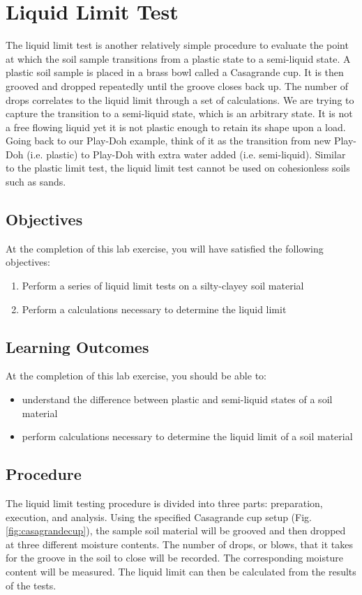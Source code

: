 \documentclass[12pt]{article}
\begin{document}
\pagebreak
\section{Liquid Limit Test}
The liquid limit test is another relatively simple procedure to evaluate the point at which the soil sample transitions from a plastic state to a semi-liquid state. A plastic soil sample is placed in a brass bowl called a Casagrande cup. It is then grooved and dropped repeatedly until the groove closes back up. The number of drops correlates to the liquid limit through a set of calculations. We are trying to capture the transition to a semi-liquid state, which is an arbitrary state. It is not a free flowing liquid yet it is not plastic enough to retain its shape upon a load. Going back to our Play-Doh\textregistered{} example, think of it as the transition from new Play-Doh\textregistered{} (i.e. plastic) to Play-Doh\textregistered{} with extra water added (i.e. semi-liquid). Similar to the plastic limit test, the liquid limit test cannot be used on cohesionless soils such as sands.

\subsection{Objectives}
At the completion of this lab exercise, you will have satisfied the following objectives:
\begin{enumerate}
    \item Perform a series of liquid limit tests on a silty-clayey soil material
    \item Perform a calculations necessary to determine the liquid limit
\end{enumerate}

\subsection{Learning Outcomes}
At the completion of this lab exercise, you should be able to:
\begin{itemize}
    \item understand the difference between plastic and semi-liquid states of a soil material
    \item perform calculations necessary to determine the liquid limit of a soil material
\end{itemize}

\pagebreak
\subsection{Procedure}
The liquid limit testing procedure is divided into three parts: preparation, execution, and analysis. Using the specified Casagrande cup setup (Fig. \ref{fig:casagrandecup}), the sample soil material will be grooved and then dropped at three different moisture contents. The number of drops, or blows, that it takes for the groove in the soil to close will be recorded. The corresponding moisture content will be measured. The liquid limit can then be calculated from the results of the tests.
\end{document}
